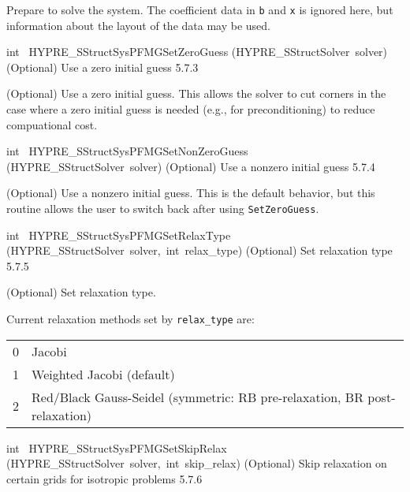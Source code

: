 \documentclass{article}
\begin{document}
\begin{cxxentry}
\begin{cxxentry}
\begin{cxxfunction}
\begin{cxxdoc}
Prepare to solve the system.  The coefficient data in {\tt b} and {\tt x} is
ignored here, but information about the layout of the data may be used.
\end{cxxdoc}
\end{cxxfunction}
\begin{cxxfunction}
{int\ }
        {HYPRE\_SStructSysPFMGSetZeroGuess}
        {(HYPRE\_SStructSolver\ solver)}
        {
(Optional) Use a zero initial guess}
        {5.7.3}
\begin{cxxdoc}

(Optional) Use a zero initial guess.  This allows the solver to cut corners
in the case where a zero initial guess is needed (e.g., for preconditioning)
to reduce compuational cost.
\end{cxxdoc}
\end{cxxfunction}
\begin{cxxfunction}
{int\ }
        {HYPRE\_SStructSysPFMGSetNonZeroGuess}
        {(HYPRE\_SStructSolver\ solver)}
        {
(Optional) Use a nonzero initial guess}
        {5.7.4}
\begin{cxxdoc}

(Optional) Use a nonzero initial guess.  This is the default behavior, but
this routine allows the user to switch back after using {\tt SetZeroGuess}.
\end{cxxdoc}
\end{cxxfunction}
\begin{cxxfunction}
{int\ }
        {HYPRE\_SStructSysPFMGSetRelaxType}
        {(HYPRE\_SStructSolver\ solver,\ int\ relax\_type)}
        {
(Optional) Set relaxation type}
        {5.7.5}
\begin{cxxdoc}

(Optional) Set relaxation type.

Current relaxation methods set by {\tt relax\_type} are:

\begin{tabular}{l@{ -- }l}
0 & Jacobi \\
1 & Weighted Jacobi (default) \\
2 & Red/Black Gauss-Seidel (symmetric: RB pre-relaxation, BR post-relaxation) \\
\end{tabular}
\end{cxxdoc}
\end{cxxfunction}
\begin{cxxfunction}
{int\ }
        {HYPRE\_SStructSysPFMGSetSkipRelax}
        {(HYPRE\_SStructSolver\ solver,\ int\ skip\_relax)}
        {
(Optional) Skip relaxation on certain grids for isotropic problems}
        {5.7.6}
\begin{cxxdoc}


\end{cxxdoc}
\end{cxxfunction}
\end{cxxentry}
\end{cxxentry}
\end{document}
